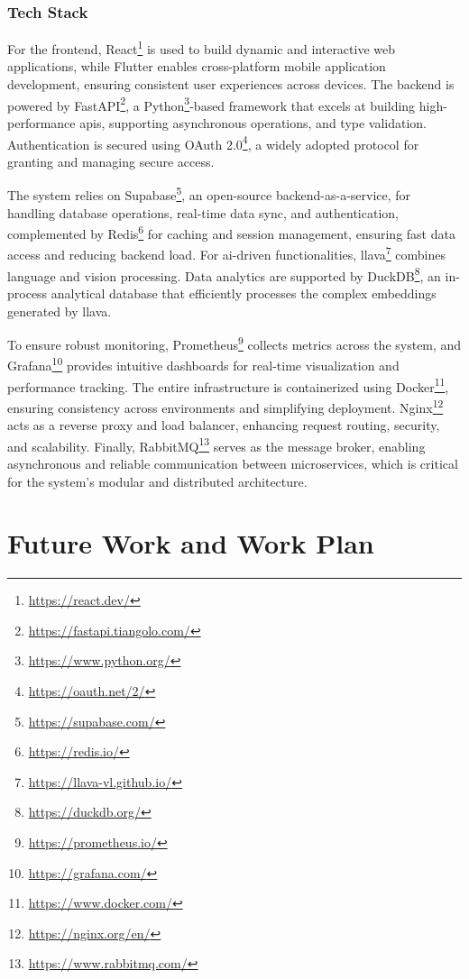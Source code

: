 \subsubsection{Tech Stack}

For the frontend, React\footnote{\url{https://react.dev/}} is used to build dynamic and interactive web applications, while Flutter enables cross-platform mobile application development, ensuring consistent user experiences across devices. The backend is powered by FastAPI\footnote{\url{https://fastapi.tiangolo.com/}}, a Python\footnote{\url{https://www.python.org/}}-based framework that excels at building high-performance \acp{api}, supporting asynchronous operations, and type validation. Authentication is secured using OAuth 2.0\footnote{\url{https://oauth.net/2/}}, a widely adopted protocol for granting and managing secure access.

The system relies on Supabase\footnote{\url{https://supabase.com/}}, an open-source backend-as-a-service, for handling database operations, real-time data sync, and authentication, complemented by Redis\footnote{\url{https://redis.io/}} for caching and session management, ensuring fast data access and reducing backend load. For \ac{ai}-driven functionalities, \ac{llava}\footnote{\url{https://llava-vl.github.io/}} combines language and vision processing. Data analytics are supported by DuckDB\footnote{\url{https://duckdb.org/}}, an in-process analytical database that efficiently processes the complex embeddings generated by \ac{llava}.

To ensure robust monitoring, Prometheus\footnote{\url{https://prometheus.io/}} collects metrics across the system, and Grafana\footnote{\url{https://grafana.com/}} provides intuitive dashboards for real-time visualization and performance tracking. The entire infrastructure is containerized using Docker\footnote{\url{https://www.docker.com/}}, ensuring consistency across environments and simplifying deployment. Nginx\footnote{\url{https://nginx.org/en/}} acts as a reverse proxy and load balancer, enhancing request routing, security, and scalability. Finally, RabbitMQ\footnote{\url{https://www.rabbitmq.com/}} serves as the message broker, enabling asynchronous and reliable communication between microservices, which is critical for the system's modular and distributed architecture.


\section{Future Work and Work Plan} \label{section:future_work_and_work_plan}

